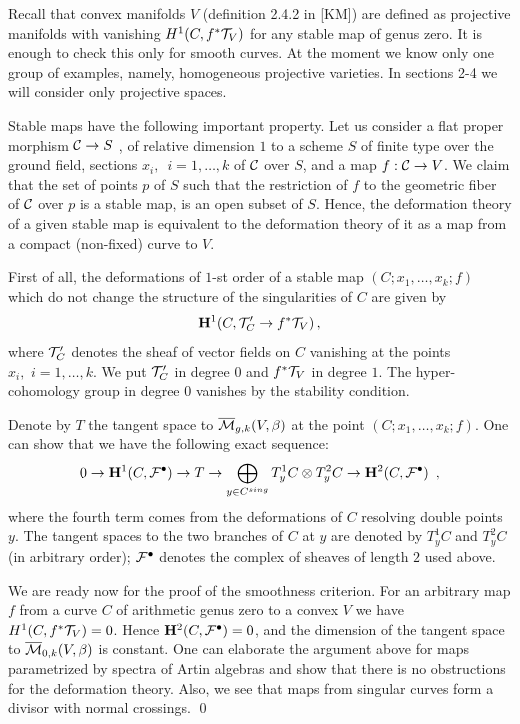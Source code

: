 \documentclass{amsart}
\begin{document}
Recall that convex manifolds $V$ (definition 2.4.2 in [KM])
 are defined as projective manifolds with vanishing $H^1(C,f^*\mathcal T_V)$ for
any stable map of genus zero. It is enough to check this only for smooth
curves. At the moment we know only one group of examples, namely, homogeneous
projective varieties. In sections 2-4   we will consider only projective
spaces.


Stable maps have the following important property.
  Let us consider  a flat proper morphism $\mathcal C\to S$
 , of relative dimension $1$ to a scheme $S$ of finite type over the ground
field, sections $x_i,\,\,\,i=1,\dots, k$ of $\mathcal C$ over $S$, and a map
$f:\mathcal C\to  V$. We claim that the set of points $p$ of $S$ such that the
restriction of $f$ to the geometric fiber of $\mathcal C$ over $p$ is a stable map,
is an open subset of $S$. Hence, the deformation theory of a given stable map
is equivalent to the deformation theory   of it as  a map from a compact
(non-fixed) curve to $V$.

First of all, the deformations of $1$-st order of a stable map
 $(C;x_1,\dots,x_k;f)$ which do not change the structure of the singularities
of $C$ are given by
  $$\bold H^1(C,\mathcal T'_{C}\to f^*\mathcal T_V)\,,$$
where $\mathcal T'_{C}$ denotes the sheaf of vector fields on $C$
 vanishing at the points $x_i,\,\,i=1,\dots,k$. We put $\mathcal T'_{C}$ in  degree
$0$ and $ f^*\mathcal T_V$ in  degree $1$. The hyper-cohomology group in degree $0$
vanishes by the stability condition.

Denote by $T$  the tangent space to  $\overline{\mathcal{M}}_{g,k}(V,\beta)$ at the point
$(C;x_1,\dots,x_k;f)$.
 One can show that we have the following exact sequence:
$$0\to \mathbf H^1(C,\mathcal F^{\bullet})\to T\to \bigoplus_
{y\in C^{sing}} T_y^1C\otimes T_y^2C\to \mathbf H^2(C,\mathcal F^{\bullet})\,\,\,,$$
 where the fourth term comes from the deformations of $C$ resolving double
points $y$. The tangent spaces  to the two branches of $C$ at $y$ are denoted
by $T_y^1C$ and $T_y^2C$ (in arbitrary order); $\mathcal F^{\bullet}$ denotes the
complex of sheaves of length $2$ used above.

We are ready now for the proof of the smoothness criterion.
 For an arbitrary map $f$ from a curve $C$ of arithmetic genus zero to a convex
$V$ we have
 $H^1(C,f^*\mathcal T_V)=0$.
  Hence $\bold H^2(C,\mathcal F^{\bullet})=0$, and the dimension of the tangent
space
 to $\overline{\mathcal{M}}_{0,k}(V,\beta)$ is constant. One can elaborate the argument above for
maps parametrized by spectra of Artin algebras and  show that there is no
obstructions for the deformation theory.
  Also, we see that maps from singular curves form a divisor with normal
crossings.
\qed
\end{document}
